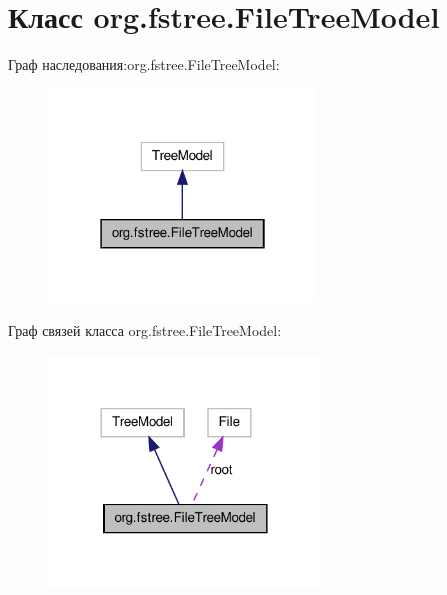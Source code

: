 \hypertarget{classorg_1_1fstree_1_1_file_tree_model}{
\section{Класс org.fstree.FileTreeModel}
\label{classorg_1_1fstree_1_1_file_tree_model}
}


Граф наследования:org.fstree.FileTreeModel:\nopagebreak
\begin{figure}[H]
\begin{center}
\leavevmode
\includegraphics[width=202pt]{classorg_1_1fstree_1_1_file_tree_model__inherit__graph}
\end{center}
\end{figure}


Граф связей класса org.fstree.FileTreeModel:\nopagebreak
\begin{figure}[H]
\begin{center}
\leavevmode
\includegraphics[width=204pt]{classorg_1_1fstree_1_1_file_tree_model__coll__graph}
\end{center}
\end{figure}
